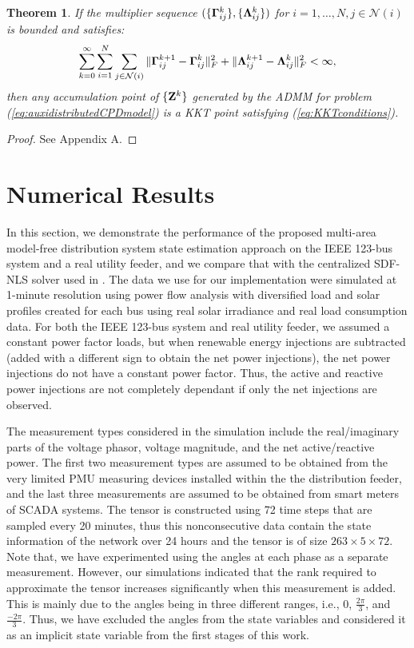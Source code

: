 \documentclass[journal]{IEEEtran}
\newcounter{assume}
\newcounter{propose}
\newcounter{thm}
\newtheorem{theorem}[thm]{Theorem}
\newcommand{\revision}[1]{{\color{black} #1}} %
\newcommand{\rev}[1]{{\color{black} #1}} %
\newcommand{\bZ}{{\bf Z}}
\begin{document}
 \begin{theorem}
 If the multiplier sequence $(\{{\bf{\Gamma}}_{ij}^k\}, \{{\bf{\Lambda}}_{ij}^k\})$ for $i=1,\ldots, N, j\in \mathcal{N}(i)$ is bounded and satisfies:
\begin{equation}
\label{ineq:boundassumption}
    \sum\limits_{k=0}^{\infty}\sum_{i=1}^N\sum_{j\in\mathcal{N}(i)}\|{\bf{\Gamma}}_{ij}^{k+1}-{\bf{\Gamma}}_{ij}^k\|_F^2+\|{\bf{\Lambda}}_{ij}^{k+1}-{\bf{\Lambda}}_{ij}^k\|_F^2<\infty,
\end{equation}
then any accumulation point of $\{\bZ^k\}$ generated by the ADMM for problem 
(\ref{eq:auxidistributedCPDmodel}) is a KKT point satisfying (\ref{eq:KKTconditions}).
 \end{theorem}
\begin{proof}
See Appendix A.
\end{proof}
\section{Numerical Results}
\label{sec:numericalresults}
In this section, we demonstrate the performance of the proposed multi-area model-free distribution system state estimation approach on the IEEE 123-bus system \rev{and a real utility feeder}, and we compare that with the centralized SDF-NLS solver used in \cite{Zamzam2020}. \rev{The data
we use for our implementation were simulated at 1-minute
resolution using power flow analysis with diversified load and
solar profiles created for each bus using real solar irradiance
and real load consumption data. For both the IEEE 123-bus system and real utility feeder, we assumed
a constant power factor loads, but when renewable energy injections are subtracted (added with
a different sign to obtain the net power injections), the net power injections  do not have a constant
power factor. Thus, the active and reactive power injections are not completely dependant if only
the net injections are observed.}

\revision{\rev{ The measurement types considered in the simulation include the real/imaginary parts of the voltage phasor, voltage magnitude, and the net active/reactive power.} \rev{The first two measurement types are assumed to be obtained from the very limited PMU measuring devices installed within the the distribution feeder, and the last three measurements are assumed to be obtained from smart meters of SCADA systems.}  The tensor is constructed using 72 time steps that are sampled  every 20 minutes, thus this nonconsecutive data contain the state information
of the network over 24 hours and the tensor is of size $263\times 5\times 72$.} \rev{Note that, we have experimented using the angles at each phase as a separate measurement. However, our simulations indicated that the rank required to approximate the tensor increases significantly when this measurement is added. This is mainly due to the angles being in three different ranges, i.e., $0$, $\frac{2\pi}{3}$, and $\frac{-2\pi}{3}$. Thus, we have excluded the angles from the state variables and considered it as an implicit state variable from the first stages of this work.}
\end{document}
